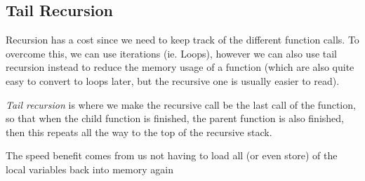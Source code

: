 \subsection{Tail Recursion}\label{sub:tail_recursion}

Recursion has a cost since we need to keep track of the different function calls.
To overcome this, we can use iterations (ie. Loops), however we can also use tail recursion instead to reduce the memory usage of a function (which are also quite easy to convert to loops later, but the recursive one is usually easier to read).

\emph{Tail recursion} is where we make the recursive call be the last call of the function, so that when the child function is finished, the parent function is also finished, then this repeats all the way to the top of the recursive stack.
\begin{note}
    The speed benefit comes from us not having to load all (or even store) of the local variables back into memory again
\end{note}
